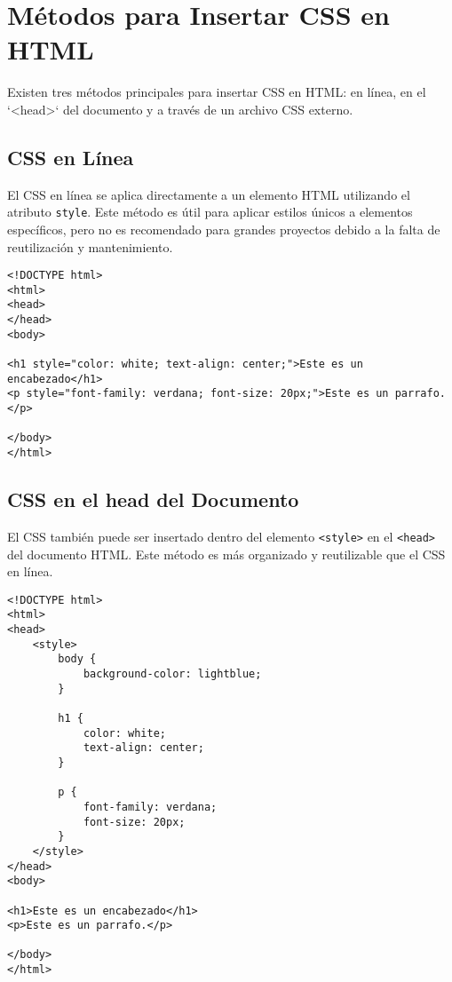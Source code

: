 \documentclass{book}
\begin{document}
\section{Métodos para Insertar CSS en HTML}

Existen tres métodos principales para insertar CSS en HTML: en línea, en el `<head>` del documento y a través de un archivo CSS externo.

\subsection{CSS en Línea}

El CSS en línea se aplica directamente a un elemento HTML utilizando el atributo \texttt{style}. Este método es útil para aplicar estilos únicos a elementos específicos, pero no es recomendado para grandes proyectos debido a la falta de reutilización y mantenimiento.

\begin{lstlisting}[language=HTML5]
<!DOCTYPE html>
<html>
<head>
</head>
<body>

<h1 style="color: white; text-align: center;">Este es un encabezado</h1>
<p style="font-family: verdana; font-size: 20px;">Este es un parrafo.</p>

</body>
</html>
\end{lstlisting}

\subsection{CSS en el \<head\> del Documento}

El CSS también puede ser insertado dentro del elemento \texttt{<style>} en el \texttt{<head>} del documento HTML. Este método es más organizado y reutilizable que el CSS en línea.

\begin{lstlisting}[language=HTML5]
<!DOCTYPE html>
<html>
<head>
    <style>
        body {
            background-color: lightblue;
        }

        h1 {
            color: white;
            text-align: center;
        }

        p {
            font-family: verdana;
            font-size: 20px;
        }
    </style>
</head>
<body>

<h1>Este es un encabezado</h1>
<p>Este es un parrafo.</p>

</body>
</html>
\end{lstlisting}
\end{document}
